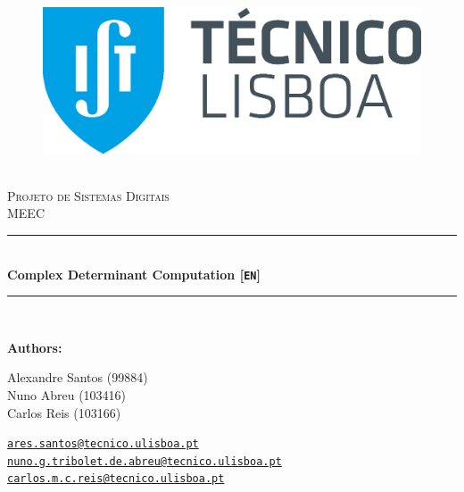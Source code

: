 \documentclass[12pt]{article}
\newcommand{\HRule}{\rule{\linewidth}{0.5mm}} %
\begin{document}
\begin{center}
    \begin{figure}
        \vspace{-1.0cm}
        \includegraphics[scale = 0.3, left]{images/IST_A.eps} %
    \end{figure}
    \mbox{}\\[2.0cm]
    \textsc{\Huge Projeto de Sistemas Digitais}\\[2.5cm]
    \textsc{\LARGE MEEC}\\[2.0cm]
    \HRule\\[0.4cm]
    {\large \bf {\selectfont Complex Determinant Computation} [\texttt{EN}]}\\[0.2cm]
    \HRule\\[1.5cm]
\end{center}

\begin{flushleft}
    \textbf{\selectfont Authors:}
\end{flushleft}

\begin{center}
    \begin{minipage}{0.4\textwidth}
        \begin{flushleft}
            Alexandre Santos (99884)\\
            Nuno Abreu (103416)\\
            Carlos Reis (103166) \\
        \end{flushleft}
    \end{minipage}%
    \begin{minipage}{0.6\textwidth}
        \begin{flushright}
            \href{mailto:ares.santos@tecnico.ulisboa.pt}{\texttt{ares.santos@tecnico.ulisboa.pt}}\\
            \href{mailto:nuno.g.tribolet.de.abreu@tecnico.ulisboa.pt}{\texttt{nuno.g.tribolet.de.abreu@tecnico.ulisboa.pt}}\\
            \href{mailto:carlos.m.c.reis@tecnico.ulisboa.pt}{\texttt{carlos.m.c.reis@tecnico.ulisboa.pt}}\\
            
        \end{flushright}
    \end{minipage}


\end{center}
    
\end{document}
